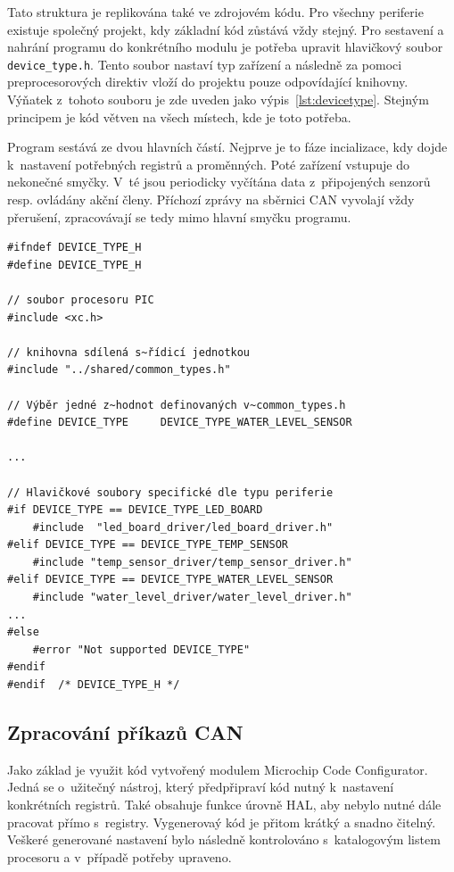     Tato struktura je replikována také ve zdrojovém kódu. Pro všechny periferie existuje společný projekt, kdy základní kód zůstává vždy stejný. Pro sestavení a nahrání programu do konkrétního modulu je potřeba upravit hlavičkový soubor \texttt{device\_type.h}. Tento soubor nastaví typ zařízení a následně za pomoci preprocesorových direktiv vloží do projektu pouze odpovídající knihovny. Výňatek z~tohoto souboru je zde uveden jako výpis~\ref{lst:devicetype}. Stejným principem je kód větven na všech místech, kde je toto potřeba. 

    Program sestává ze dvou hlavních částí. Nejprve je to fáze incializace, kdy dojde k~nastavení potřebných registrů a proměnných. Poté zařízení vstupuje do nekonečné smyčky. V~té jsou periodicky vyčítána data z~připojených senzorů resp. ovládány akční členy.  Příchozí zprávy na sběrnici CAN vyvolají vždy přerušení, zpracovávají se tedy mimo hlavní smyčku programu. 

\clearpage %
\begin{lstlisting}[frame=single,caption={Část souboru \texttt{device\_type.h} sloužící k~výběru typu cílené periferie.},label=lst:devicetype,basicstyle=\ttfamily\small, keywordstyle=\color{black}\bfseries\underbar,]
#ifndef DEVICE_TYPE_H
#define	DEVICE_TYPE_H

// soubor procesoru PIC
#include <xc.h>   

// knihovna sdílená s~řídicí jednotkou
#include "../shared/common_types.h" 

// Výběr jedné z~hodnot definovaných v~common_types.h
#define DEVICE_TYPE     DEVICE_TYPE_WATER_LEVEL_SENSOR

...

// Hlavičkové soubory specifické dle typu periferie
#if DEVICE_TYPE == DEVICE_TYPE_LED_BOARD
    #include  "led_board_driver/led_board_driver.h"
#elif DEVICE_TYPE == DEVICE_TYPE_TEMP_SENSOR
    #include "temp_sensor_driver/temp_sensor_driver.h"
#elif DEVICE_TYPE == DEVICE_TYPE_WATER_LEVEL_SENSOR
    #include "water_level_driver/water_level_driver.h"
...
#else
    #error "Not supported DEVICE_TYPE"
#endif
#endif	/* DEVICE_TYPE_H */
\end{lstlisting}

\subsection{Zpracování příkazů CAN}
    Jako základ je využit kód vytvořený modulem Microchip Code Configurator. Jedná se o~užitečný nástroj, který předpřipraví kód nutný k~nastavení konkrétních registrů. Také obsahuje funkce úrovně HAL, aby nebylo nutné dále pracovat přímo s~registry. Vygenerovaý kód je přitom krátký a snadno čitelný. Veškeré generované nastavení bylo následně kontrolováno s~katalogovým listem procesoru a v~případě potřeby upraveno. 

